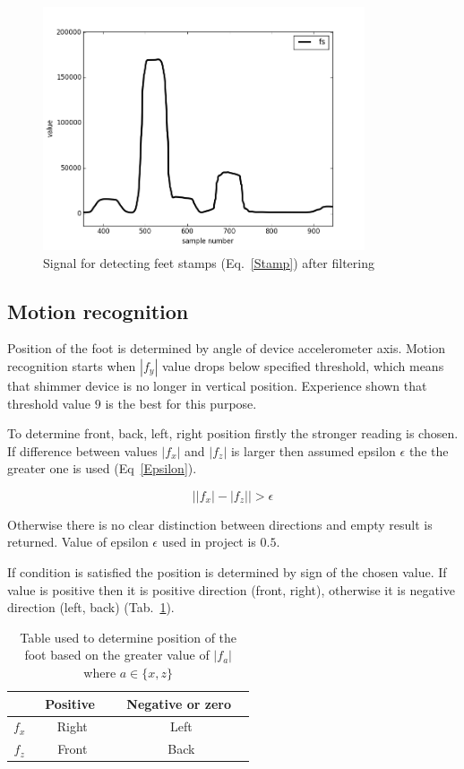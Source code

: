 \documentclass[conference]{IEEEtran}
\begin{document}
\begin{figure}[!h]
    \centering
    \includegraphics[width=9.5cm]{Images/StampFiltered.png}
    \caption{Signal for detecting feet stamps (Eq.~\ref{Stamp}) after filtering}
    \label{fig:StampFiltered}
\end{figure}

\subsection{Motion recognition}

Position of the foot is determined by angle of device accelerometer axis.
Motion recognition starts when $|f_y|$ value drops below specified threshold, which means that shimmer device is no longer in vertical position. Experience shown that threshold value $9$ is the best for this purpose.

To determine front, back, left, right position firstly the stronger reading is chosen.
If difference between values $|f_x|$ and $|f_z|$ is larger then assumed epsilon $\epsilon$ the the greater one is used (Eq~\ref{Epsilon}).

\begin{equation}
    \left||f_x| - |f_z|\right| > \epsilon
    \label{Epsilon}
\end{equation}

Otherwise there is no clear distinction between directions and empty result is returned.
Value of epsilon $\epsilon$ used in project is $0.5$.

If condition is satisfied the position is determined by sign of the chosen value.
If value is positive then it is positive direction (front, right), otherwise it is negative direction (left, back) (Tab.~\ref{Directions}).

\begin{table}[h!]
	\caption{Table used to determine position of the foot based on the greater value of $|f_a|$ where $a \in \{x, z\}$}
	\begin{center}
		\begin{tabular}{c|cc}
			& \ Positive \ &\ Negative or zero \ \\
			\hline
			$f_x$&Right&Left\\
			$f_z$&Front&Back\\
		\end{tabular}
		\label{Directions}
	\end{center}
\end{table}
\end{document}
